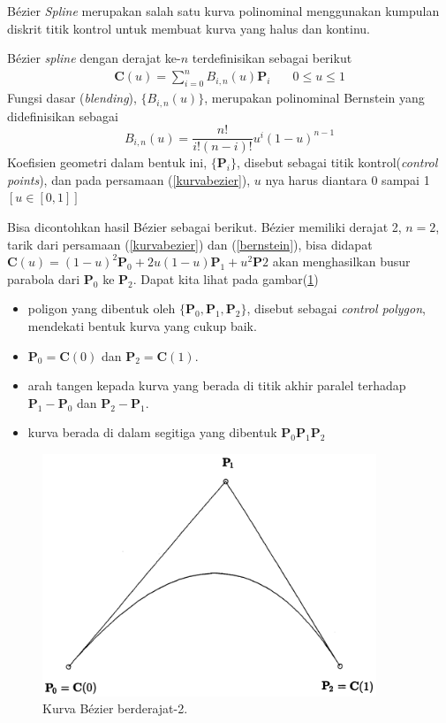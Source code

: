 Bézier \textit{Spline} merupakan salah satu kurva polinominal 
menggunakan kumpulan diskrit titik kontrol untuk 
membuat kurva yang halus dan kontinu. 

Bézier \textit{spline} dengan derajat ke-$n$ terdefinisikan 
sebagai berikut
\begin{equation}
	\begin{split}
		\textbf{C}(u) = \sum_{i = 0}^{n} B_{i,n}(u) \textbf{P}_i \quad
		& 0 \leq u \leq 1
	\end{split}
	\label{kurvabezier}
\end{equation}
Fungsi dasar (\textit{blending}), $\{B_{i,n}(u)\}$, merupakan 
polinominal Bernstein yang didefinisikan sebagai
\begin{equation}
	B_{i,n}(u) = \frac{n!}{i!(n-i)!} u^i (1-u)^{n-1}
	\label{bernstein}
\end{equation}
Koefisien geometri dalam bentuk ini, $\{\textbf{P}_i\}$, disebut 
sebagai titik kontrol(\textit{control points}), dan pada 
persamaan (\ref{kurvabezier}), $u$ nya harus diantara 0 sampai 1 
$[u \in [0,1]]$

Bisa dicontohkan hasil Bézier sebagai berikut. Bézier 
memiliki derajat 2, $n = 2$, tarik dari persamaan 
(\ref{kurvabezier}) dan (\ref{bernstein}), bisa didapat
$\textbf{C}(u) = (1 - u)^2 \textbf{P}_0 + 2u(1 - u) 
\textbf{P}_1 + u^2 \textbf{P}2$ akan menghasilkan 
busur parabola dari $\textbf{P}_0$ ke $\textbf{P}_2$. 
Dapat kita lihat pada gambar(\ref{gambar:Bezier_derajat2})
\begin{itemize}
	\item poligon yang dibentuk oleh 
	$\{\textbf{P}_0, \textbf{P}_1, \textbf{P}_2\}$, 
	disebut sebagai \textit{control polygon}, mendekati 
	bentuk kurva yang cukup baik.
	\item $\textbf{P}_0 = \textbf{C}(0)$ dan 
	$\textbf{P}_2 = \textbf{C}(1)$.
	\item arah tangen kepada kurva yang berada di titik akhir 
	paralel terhadap $\textbf{P}_1 - \textbf{P}_0$ dan 
	$\textbf{P}_2 - \textbf{P}_1$.
	\item kurva berada di dalam segitiga yang dibentuk 
	$\textbf{P}_0\textbf{P}_1\textbf{P}_2$
\end{itemize}
\begin{figure}[H]
	\centering
	\includegraphics[keepaspectratio, width=10cm]{gambar/Interpolasi/bezierderajat2.png} 
	\caption{Kurva Bézier berderajat-2.}
	\label{gambar:Bezier_derajat2}
\end{figure}


